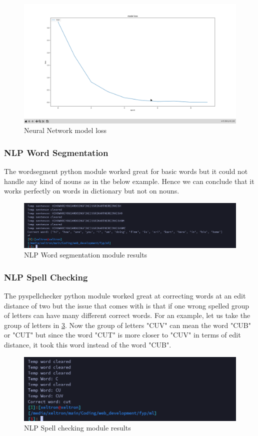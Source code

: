 \documentclass[12pt,a4paper]{report}
\begin{document}
\begin{figure}[htbp]
	\centerline{\includegraphics[scale=0.15]{neural_network_loss.png}}
	\caption{Neural Network model loss}
	\label{Neural_net_loss}
\end{figure}

\subsubsection{NLP Word Segmentation}
The wordsegment python module worked great for basic words but it could not handle any kind of nouns as in the below example. Hence we can conclude that it works perfectly on words in dictionary but not on nouns.
\begin{figure}[htbp]
	\centerline{\includegraphics[scale=0.25]{word_segment.png}}
	\caption{NLP Word segmentation module results}
	\label{Word_segment}
\end{figure}

\subsubsection{NLP Spell Checking}
The pyspellchecker python module worked great at correcting words at an edit distance of two but the issue that comes with is that if one wrong spelled group of letters can have many different correct words. For an example, let us take the group of letters in \ref{Spell_check}. Now the group of letters "CUV" can mean the word "CUB" or "CUT" but since the word "CUT" is more closer to "CUV" in terms of edit distance, it took this word instead of the word "CUB".
\begin{figure}[htbp]
	\centerline{\includegraphics[scale=0.4]{spell_check.png}}
	\caption{NLP Spell checking module results}
	\label{Spell_check}
\end{figure}
\end{document}
